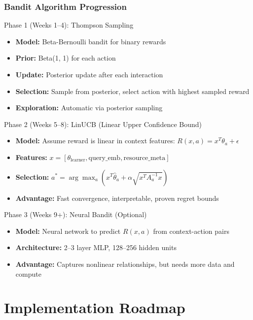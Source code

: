 \documentclass[aspectratio=169]{beamer}
\begin{document}
\begin{frame}
\frametitle{Bandit Algorithm Progression}
\begin{block}{Phase 1 (Weeks 1--4): Thompson Sampling}
\begin{itemize}
\item \textbf{Model:} Beta-Bernoulli bandit for binary rewards
\item \textbf{Prior:} Beta(1, 1) for each action
\item \textbf{Update:} Posterior update after each interaction
\item \textbf{Selection:} Sample from posterior, select action with highest sampled reward
\item \textbf{Exploration:} Automatic via posterior sampling
\end{itemize}
\end{block}

\begin{block}{Phase 2 (Weeks 5--8): LinUCB (Linear Upper Confidence Bound)}
\begin{itemize}
\item \textbf{Model:} Assume reward is linear in context features: $R(x, a) = x^T \theta_a + \epsilon$
\item \textbf{Features:} $x = [\theta_{\text{learner}}, \text{query\_emb}, \text{resource\_meta}]$
\item \textbf{Selection:} $a^* = \arg\max_a \left( x^T \hat{\theta}_a + \alpha \sqrt{x^T A_a^{-1} x} \right)$
\item \textbf{Advantage:} Fast convergence, interpretable, proven regret bounds
\end{itemize}
\end{block}

\begin{block}{Phase 3 (Weeks 9+): Neural Bandit (Optional)}
\begin{itemize}
\item \textbf{Model:} Neural network to predict $R(x, a)$ from context-action pairs
\item \textbf{Architecture:} 2--3 layer MLP, 128--256 hidden units
\item \textbf{Advantage:} Captures nonlinear relationships, but needs more data and compute
\end{itemize}
\end{block}
\end{frame}

\section{Implementation Roadmap}
\end{document}
